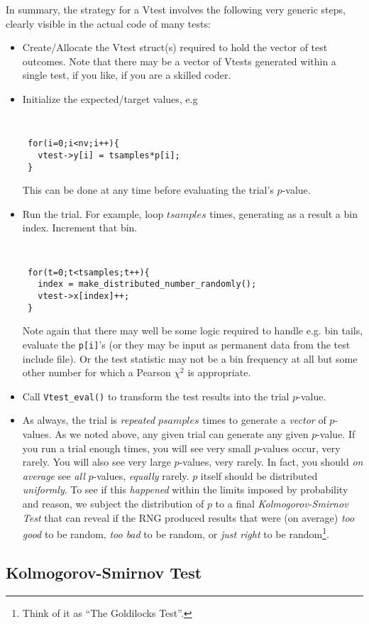 \documentclass[12pt]{book}
\newcommand{\bv}{ \begin{verbatim} }
\begin{document}
In summary, the strategy for a Vtest involves the following very generic
steps, clearly visible in the actual code of many tests:
\begin{itemize}
 \item Create/Allocate the Vtest struct(s) required to hold the vector
of test outcomes.  Note that there may be a vector of Vtests generated
within a single test, if you like, if you are a skilled coder.
 \item Initialize the expected/target values, e.g
{\tt
\bv
 for(i=0;i<nv;i++){
   vtest->y[i] = tsamples*p[i];
 }
\end{verbatim}
}
This can be done at any time before evaluating the trial's $p$-value.
 \item Run the trial. For example, loop $tsamples$ times, generating as
a result a bin index.  Increment that bin.
{\tt
\bv
 for(t=0;t<tsamples;t++){
   index = make_distributed_number_randomly();
   vtest->x[index]++;
 }
\end{verbatim}
}
Note again that there may well be some logic required to handle e.g. bin
tails, evaluate the {\tt p[i]}'s (or they may be input as permanent data
from the test include file).  Or the test statistic may not be a bin
frequency at all but some other number for which a Pearson $\chi^2$ is
appropriate.
 \item Call {\tt Vtest\_eval()} to transform the test results into the
trial $p$-value.
 \item As always, the trial is {\em repeated} $psamples$ times to
generate a {\em vector} of $p$-values.  As we noted above, any given
trial can generate any given $p$-value.  If you run a trial enough
times, you will see very small $p$-values occur, very rarely.  You will
also see very large $p$-values, very rarely.  In fact, you should {\em
on average} see {\em all} $p$-values, {\em equally} rarely.  $p$ itself
should be distributed {\em uniformly}.  To see if this {\em happened}
within the limits imposed by probability and reason, we subject the
distribution of $p$ to a final {\em Kolmogorov-Smirnov Test} that can
reveal if the RNG produced results that were (on average) {\em too good}
to be random, {\em too bad} to be random, or {\em just right} to be
random\footnote{Think of it as ``The Goldilocks Test''.}.
\end{itemize}

\subsection{Kolmogorov-Smirnov Test}
\end{document}
